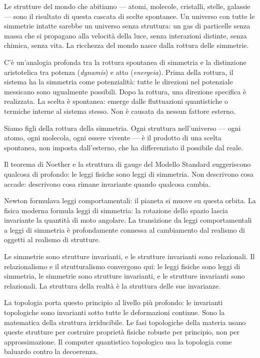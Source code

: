 \documentclass[12pt,a4paper,openany]{book}
\newcommand{\sezione}[1]{\vspace{1.2em}{\large\bfseries #1}\vspace{0.5em}\par}
\begin{document}
Le strutture del mondo che abitiamo — atomi, molecole, cristalli, stelle, galassie — sono il risultato di questa cascata di scelte spontanee. Un universo con tutte le simmetrie intatte sarebbe un universo senza struttura: un gas di particelle senza massa che si propagano alla velocità della luce, senza interazioni distinte, senza chimica, senza vita. La ricchezza del mondo nasce dalla rottura delle simmetrie.

\sezione{Implicazione filosofica: la simmetria come potenzialità}

C'è un'analogia profonda tra la rottura spontanea di simmetria e la distinzione aristotelica tra potenza (\textit{dynamis}) e atto (\textit{energeia}). Prima della rottura, il sistema ha la simmetria come potenzialità: tutte le direzioni nel potenziale messicano sono ugualmente possibili. Dopo la rottura, una direzione specifica è realizzata. La scelta è spontanea: emerge dalle fluttuazioni quantistiche o termiche interne al sistema stesso. Non è causata da nessun fattore esterno.

Siamo figli della rottura della simmetria. Ogni struttura nell'universo --- ogni atomo, ogni molecola, ogni essere vivente --- è il prodotto di una scelta spontanea, non imposta dall'esterno, che ha differenziato il possibile dal reale.

\sezione{La simmetria come principio ontologico}

Il teorema di Noether e la struttura di gauge del Modello Standard suggeriscono qualcosa di profondo: le leggi fisiche sono leggi di simmetria. Non descrivono cosa accade: descrivono cosa rimane invariante quando qualcosa cambia.

Newton formulava leggi comportamentali: il pianeta si muove su questa orbita. La fisica moderna formula leggi di simmetria: la rotazione dello spazio lascia invariante la quantità di moto angolare. La transizione da leggi comportamentali a leggi di simmetria è profondamente connessa al cambiamento dal realismo di oggetti al realismo di strutture.

Le simmetrie sono strutture invarianti, e le strutture invarianti sono relazionali. Il relazionalismo e il strutturalismo convergono qui: le leggi fisiche sono leggi di simmetria, le simmetrie sono strutture invarianti, e le strutture invarianti sono relazionali. La struttura della realtà è la struttura delle sue invarianze.

La topologia porta questo principio al livello più profondo: le invarianti topologiche sono invarianti sotto tutte le deformazioni continue. Sono la matematica della struttura irriducibile. Le fasi topologiche della materia usano queste strutture per costruire proprietà fisiche robuste per principio, non per approssimazione. Il computer quantistico topologico usa la topologia come baluardo contro la decoerenza.
\end{document}
